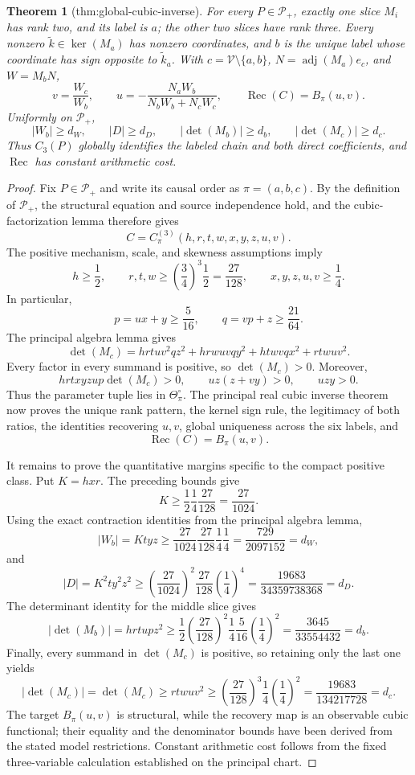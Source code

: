 \documentclass{article}
\newtheorem{theorem}{Theorem}
\begin{document}
\begin{theorem}[thm:global-cubic-inverse]\label{thm:global-cubic-inverse}
For every \(P\in\mathcal P_+\), exactly one slice \(M_i\) has rank two, and its label is \(a\); the other two slices have rank three. Every nonzero \(\widetilde k\in\ker(M_a)\) has nonzero coordinates, and \(b\) is the unique label whose coordinate has sign opposite to \(\widetilde k_a\). With \(c=\mathcal V\setminus\{a,b\}\), \(N=\operatorname{adj}(M_a)e_c\), and \(W=M_bN\),
\[
v=\frac{W_c}{W_b},\qquad u=-\frac{N_aW_b}{N_bW_b+N_cW_c},\qquad \operatorname{Rec}(C)=B_\pi(u,v).
\]
Uniformly on \(\mathcal P_+\),
\[
|W_b|\ge d_W,\qquad |D|\ge d_D,\qquad |\det(M_b)|\ge d_b,\qquad |\det(M_c)|\ge d_c.
\]
Thus \(C_3(P)\) globally identifies the labeled chain and both direct coefficients, and \(\operatorname{Rec}\) has constant arithmetic cost.
\end{theorem}
\begin{proof}
Fix \(P\in\mathcal P_+\) and write its causal order as \(\pi=(a,b,c)\).  By the definition of \(\mathcal P_+\), the structural equation and source independence hold, and the cubic-factorization lemma therefore gives
\[
C=C_{\pi}^{(3)}(h,r,t,w,x,y,z,u,v).
\]
The positive mechanism, scale, and skewness assumptions imply
\[
h\ge\frac12,
\qquad
r,t,w\ge\left(\frac34\right)^3\frac12=\frac{27}{128},
\qquad
x,y,z,u,v\ge\frac14.
\]
In particular,
\[
p=ux+y\ge\frac{5}{16},
\qquad
q=vp+z\ge\frac{21}{64}.
\]
The principal algebra lemma gives
\[
\det(M_c)=hrtuv^2qz^2+hrwuvqy^2+htwvqx^2+rtwuv^2.
\]
Every factor in every summand is positive, so \(\det(M_c)>0\).  Moreover,
\[
hrtxyzup\det(M_c)>0,
\qquad
uz(z+vy)>0,
\qquad
uzy>0.
\]
Thus the parameter tuple lies in \(\Theta_{\pi}^{\circ}\).  The principal real cubic inverse theorem now proves the unique rank pattern, the kernel sign rule, the legitimacy of both ratios, the identities recovering \(u,v\), global uniqueness across the six labels, and
\[
\operatorname{Rec}(C)=B_{\pi}(u,v).
\]

It remains to prove the quantitative margins specific to the compact positive class.  Put \(K=hxr\).  The preceding bounds give
\[
K\ge\frac12\frac14\frac{27}{128}=\frac{27}{1024}.
\]
Using the exact contraction identities from the principal algebra lemma,
\[
|W_b|=Ktyz
\ge \frac{27}{1024}\frac{27}{128}\frac14\frac14
=\frac{729}{2097152}=d_W,
\]
and
\[
|D|=K^2ty^2z^2
\ge\left(\frac{27}{1024}\right)^2\frac{27}{128}
\left(\frac14\right)^4
=\frac{19683}{34359738368}=d_D.
\]
The determinant identity for the middle slice gives
\[
|\det(M_b)|=hrtupz^2
\ge\frac12\left(\frac{27}{128}\right)^2
\frac14\frac{5}{16}\left(\frac14\right)^2
=\frac{3645}{33554432}=d_b.
\]
Finally, every summand in \(\det(M_c)\) is positive, so retaining only the last one yields
\[
|\det(M_c)|=\det(M_c)\ge rtwuv^2
\ge\left(\frac{27}{128}\right)^3\frac14
\left(\frac14\right)^2
=\frac{19683}{134217728}=d_c.
\]
The target \(B_{\pi}(u,v)\) is structural, while the recovery map is an observable cubic functional; their equality and the denominator bounds have been derived from the stated model restrictions.  Constant arithmetic cost follows from the fixed three-variable calculation established on the principal chart.
\end{proof}
\end{document}
